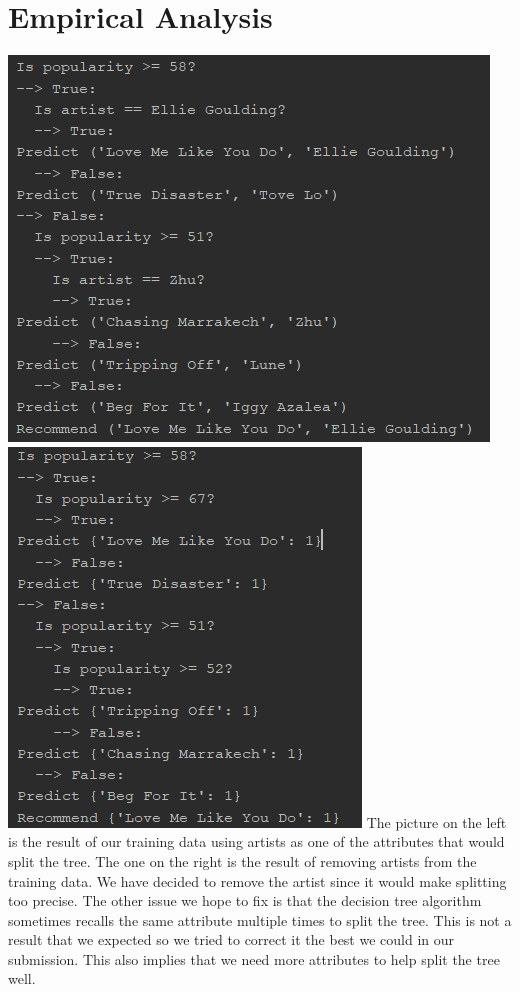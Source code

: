 \documentclass[]{report}
\begin{document}
	\section{Empirical Analysis}
	\includegraphics{FP1}
	\includegraphics{FP2}
	The picture on the left is the result of our training data using artists as one of the attributes that would split the tree. The one on the right is the result of removing artists from the training data. We have decided to remove the artist since it would make splitting too precise. The other issue we hope to fix is that the decision tree algorithm sometimes recalls the same attribute multiple times to split the tree. This is not a result that we expected so we tried to correct it the best we could in our submission. This also implies that we need more attributes to help split the tree well.\\
	
\end{document}
